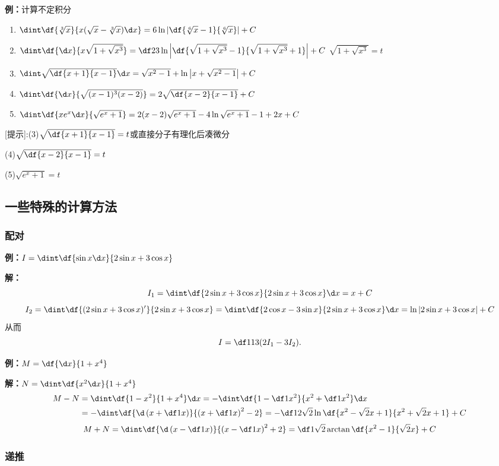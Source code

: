 {\bf 例：}计算不定积分
\begin{enumerate}[(1)]
  \setlength{\itemindent}{1cm}
  \item $\dint\df{\sqrt[3]x}{x(\sqrt x-\sqrt[3]x)\d x}=6\ln\left|
  \df{\sqrt[6]x-1}{\sqrt[6]x}\right|+C$
  \item $\dint\df{\d x}{x\sqrt{1+\sqrt{x^3}}}=\df23\ln\left|
  \df{\sqrt{1+\sqrt{x^3}}-1}{\sqrt{1+\sqrt{x^3}}+1}\right|+C$
  \hfill$\sqrt{1+\sqrt{x^3}}=t$
  \item $\dint\sqrt{\df{x+1}{x-1}}\d x=\sqrt{x^2-1}+\ln\left|
  x+\sqrt{x^2-1}\right|+C$
  \item $\dint\df{\d x}{\sqrt{(x-1)^3(x-2)}}=2\sqrt{\df{x-2}{x-1}}+C$
  \item $\dint\df{xe^x\d x}{\sqrt{e^x+1}}=2(x-2)\sqrt{e^x+1}
  -4\ln{\sqrt{e^x+1}-1}+2x+C$
\end{enumerate}

[提示]:(3)$\sqrt{\df{x+1}{x-1}}=t$或直接分子有理化后凑微分

(4)$\sqrt{\df{x-2}{x-1}}=t$

(5)$\sqrt{e^x+1}=t$

\subsection{一些特殊的计算方法}

\subsubsection{配对}

{\bf 例：}$I=\dint\df{\sin x\d x}{2\sin x+3\cos x}$

{\bf 解：}
$$I_1=\dint\df{2\sin x+3\cos x}{2\sin x+3\cos x}\d x=x+C$$
$$I_2=\dint\df{(2\sin x+3\cos x)'}{2\sin x+3\cos x}
=\dint\df{2\cos x-3\sin x}{2\sin x+3\cos x}\d x=\ln|2\sin x+3\cos x|+C$$
从而
$$I=\df1{13}(2I_1-3I_2).$$
\fin

{\bf 例：}$M=\df{\d x}{1+x^4}$

{\bf 解：}$N=\dint\df{x^2\d x}{1+x^4}$
\begin{align}
M-N&=\dint\df{1-x^2}{1+x^4}\d x=-\dint\df{1-\df1{x^2}}{x^2+\df1{x^2}}\d
x\notag\\
&=-\dint\df{\d\left(x+\df1x\right)}{\left(x+\df1x\right)^2-2}
=-\df1{2\sqrt2}\ln\df{x^2-\sqrt2x+1}{x^2+\sqrt2x+1}+C\notag
\end{align}
$$M+N=\dint\df{\d\left(x-\df1x\right)}{\left(x-\df1x\right)^2+2}
=\df1{\sqrt2}\arctan\df{x^2-1}{\sqrt2x}+C$$
\fin

\subsubsection{递推}

